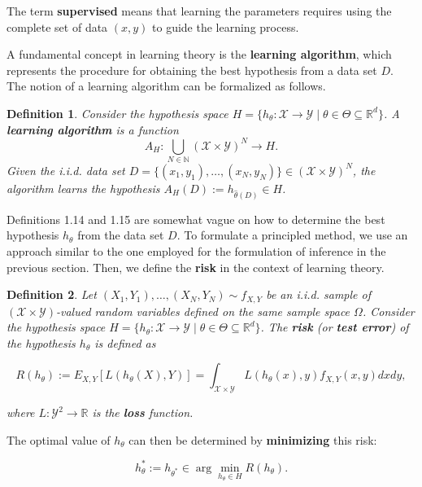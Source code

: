 \documentclass{report}
\newtheorem{definition}{Definition}[chapter]
\begin{document}
The term \textbf{supervised} means that learning the parameters requires using the complete set of data $(x,y)$ to guide the learning process.

A fundamental concept in learning theory is the \textbf{learning algorithm}, which represents the procedure for obtaining the best hypothesis from a data set $D$. The notion of a learning algorithm can be formalized as follows.

\begin{definition}
Consider the hypothesis space $H = \{h_\theta : \mathcal{X} \to \mathcal{Y} \mid\theta\in\Theta\subseteq\mathbb{R}^d\}$. A \textbf{learning algorithm} is a function \[ A_H : \bigcup_{N \in \mathbb{N}} (\mathcal{X}\times \mathcal{Y}) ^N\to H.\]
Given the  i.i.d. data set $D = \{(x_1,y_1), \dots, (x_N,y_N)\} \in (\mathcal{X} \times \mathcal{Y})^N$, the algorithm learns the hypothesis $A_H(D) := h_{\hat{\theta}(D)} \in H$.
\end{definition}

Definitions 1.14 and 1.15 are somewhat vague on how to determine the best hypothesis $h_\theta$ from the data set $D$. To formulate a principled method, we use an approach similar to the one employed for the formulation of inference in the previous section. Then, we define the \textbf{risk} in the context of learning theory.

\begin{definition}
Let $(X_1, Y_1),\dots,(X_N, Y_N) \sim f_{X,Y}$ be an i.i.d. sample of $(\mathcal{X} \times \mathcal{Y})$-valued random variables defined on the same sample space $\Omega$. Consider the hypothesis space $H = \{h_\theta : \mathcal{X} \to \mathcal{Y} \mid\theta\in\Theta\subseteq\mathbb{R}^d\}$. The \textbf{risk} (or \textbf{test error}) of the hypothesis $h_\theta$ is defined as

\begin{equation}
R(h_\theta) := E_{X,Y}[L(h_\theta(X),Y)] = \int_{\mathcal{X} \times \mathcal{Y}} L(h_\theta(x),y)f_{X,Y}(x,y)dxdy,
\end{equation}

where $L :\mathcal{Y}^2 \to \mathbb{R}$ is the \textbf{loss} function.
\end{definition}

The optimal value of $h_\theta$ can then be determined by \textbf{minimizing} this risk:

\begin{equation}
h_\theta^* := h_{\theta^*} \in \arg \min_{h_\theta \in H} R(h_\theta).
\end{equation}
\end{document}
